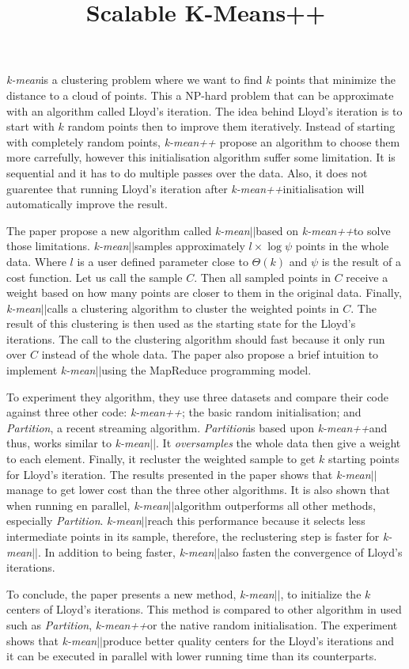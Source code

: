 \documentclass{article}
\title{Scalable K-Means++}
\newcommand{\kmean}{\textit{k-mean}}
\newcommand{\kmeanpp}{\textit{k-mean++}}
\newcommand{\km}{\textit{k-mean$\vert\vert$}}
\newcommand{\partition}{\textit{Partition}}
\begin{document}
\maketitle
\kmean is a clustering problem where we want to find $k$ points
that minimize the distance to a cloud of points. This a NP-hard problem
that can be approximate with an algorithm called Lloyd’s iteration.
The idea behind Lloyd’s iteration is to start with $k$ random points then to
improve them iteratively. Instead of starting with completely random points, \kmeanpp
propose an algorithm to choose them more carrefully, however this initialisation
algorithm suffer some limitation. It is sequential and it has to do multiple passes over
the data. Also, it does not guarentee that running Lloyd’s iteration after \kmeanpp initialisation
will automatically improve the result.

The paper propose a new algorithm called \km based on \kmeanpp to solve those limitations.
\km samples approximately $l \times \log \psi$ points in the whole data. Where $l$ is a user defined
parameter close to $\Theta (k)$ and $\psi$ is the result of a cost function. Let us call the sample $C$.
Then all sampled points in $C$ receive a weight based on how many points are closer to them in the original
data. Finally, \km calls a clustering algorithm to cluster the weighted points in $C$. The result of this
clustering is then used as the starting state for the Lloyd's iterations.
The call to the clustering algorithm should fast because it only run over $C$ instead of the whole data.
The paper also propose a brief intuition to implement \km using the MapReduce programming model.

To experiment they algorithm, they use three datasets and compare their code against three other code:
\kmeanpp; the basic random initialisation; and \partition, a recent streaming algorithm. \partition is based
upon \kmeanpp and thus, works similar to \km. It \textit{oversamples} the whole data then give a weight to
each element. Finally, it recluster the weighted sample to get $k$ starting points for Lloyd's iteration.
The results presented in the paper shows that \km manage to get lower cost than the three other algorithms.
It is also shown that when running en parallel, \km algorithm outperforms all other methods, especially \partition.
\km reach this performance because it selects less intermediate points in its sample, therefore, the reclustering step is
faster for \km. In addition to being faster, \km also fasten the convergence of Lloyd's iterations.

To conclude, the paper presents a new method, \km, to initialize the $k$ centers of Lloyd's iterations.
This method is compared to other algorithm in used such as \partition, \kmeanpp or the native random initialisation.
The experiment shows that \km produce better quality centers for the Lloyd's iterations and it can be executed in parallel
with lower running time than its counterparts.
\end{document}
